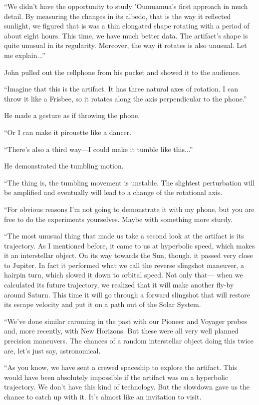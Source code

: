\documentclass[12pt]{book}
\begin{document}
``We didn't have the opportunity to study 'Oumuamua's first approach in much detail. By measuring the changes in its albedo, that is the way it reflected sunlight, we figured that is was a thin elongated shape rotating with a period of about eight hours. This time, we have much better data. The artifact's shape is quite unusual in its regularity. Moreover, the way it rotates is also unusual. Let me explain...''

John pulled out the cellphone from his pocket and showed it to the audience.

``Imagine that this is the artifact. It has three natural axes of rotation. I can throw it like a Frisbee, so it rotates along the axis perpendicular to the phone.''

He made a gesture as if throwing the phone.

``Or I can make it pirouette like a dancer.

``There's also a third way---I could make it tumble like this...''

He demonstrated the tumbling motion.

``The thing is, the tumbling movement is unstable. The slightest perturbation will be amplified and eventually will lead to a change of the rotational axis. 

``For obvious reasons I'm not going to demonstrate it with my phone, but you are free to do the experiments yourselves. Maybe with something more sturdy.

``The most unusual thing that made us take a second look at the artifact is its trajectory. As I mentioned before, it came to us at hyperbolic speed, which makes it an interstellar object. On its way towards the Sun, though, it passed very close to Jupiter. In fact it performed what we call the reverse slingshot maneuver, a hairpin turn, which slowed it down to orbital speed. Not only that--- when we calculated its future trajectory, we realized that it will make another fly-by around Saturn. This time it will go through a forward slingshot that will restore its escape velocity and put it on a path out of the Solar System.

``We've done similar caroming in the past with our Pioneer and Voyager probes and, more recently, with New Horizons. But these were all very well planned precision maneuvers. The chances of a random interstellar object doing this twice are, let's just say, astronomical. 

``As you know, we have sent a crewed spaceship to explore the artifact. This would have been absolutely impossible if the artifact was on a hyperbolic trajectory. We don't have this kind of technology. But the slowdown gave us the chance to catch up with it. It's almost like an invitation to visit.
\end{document}
